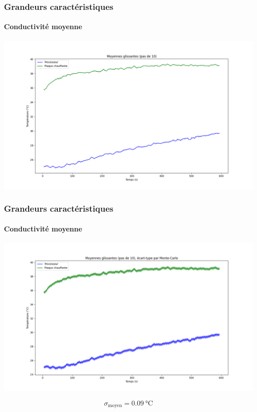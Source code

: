 \documentclass[a4paper,11pt]{beamer}
\newcommand{\cel}{\degreeCelsius}
\begin{document}
\begin{frame}
    \frametitle{Grandeurs caractéristiques}
    \framesubtitle{Conductivité moyenne}

    \includegraphics[width=\textwidth]{moyennes_glissantes.png}
\end{frame}

\begin{frame}
    \frametitle{Grandeurs caractéristiques}
    \framesubtitle{Conductivité moyenne}

    \includegraphics[width=\textwidth]{moyennes_glissantes_monte_carlo.png}

    $$\sigma_\text{moyen} = \SI{0,09}{\cel}$$
\end{frame}
\end{document}
